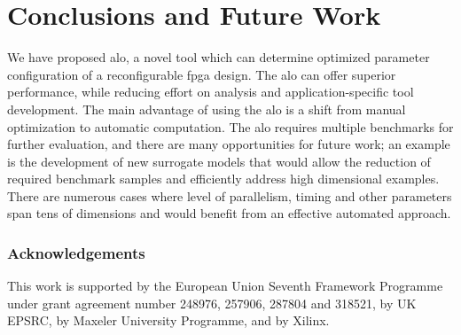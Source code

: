\documentclass[runningheads,a4paper]{llncs}
\begin{document}
%





\section{Conclusions and Future Work}

We have proposed \ac{alo}, a novel tool which can determine optimized parameter configuration of a reconfigurable \ac{fpga} design. The \ac{alo} can offer superior performance, while reducing effort on analysis and application-specific tool development. The main advantage of using the \ac{alo} is a shift from manual optimization to automatic computation. The \ac{alo} requires multiple benchmarks for further evaluation, and there are many opportunities for future work; an example is the development of new surrogate models that would allow the reduction of required benchmark samples and efficiently address high dimensional examples. There are numerous cases where level of parallelism, timing and other parameters span tens of dimensions and would benefit from an effective  automated approach.

\subsubsection*{Acknowledgements}
This work is supported by the European Union Seventh Framework Programme under grant agreement number 248976, 257906, 287804 and 318521, by UK EPSRC, by Maxeler University Programme, and by Xilinx.
 



%
\end{document}
